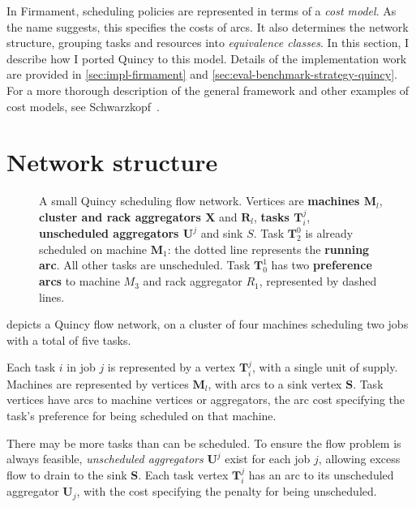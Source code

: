 In Firmament, scheduling policies are represented in terms of a \emph{cost model}. As the name suggests, this specifies the costs of arcs. It also determines the network structure, grouping tasks and resources into \emph{equivalence classes}. In this section, I describe how I ported Quincy to this model. Details of the implementation work are provided in \cref{sec:impl-firmament} and \cref{sec:eval-benchmark-strategy-quincy}. For a more thorough description of the general framework and other examples of cost models, see Schwarzkopf~\cite[ch.~5]{Schwarzkopf:2015}.

\section{Network structure} \label{appendix:flow-scheduling:structure}

\begin{figure}
    \centering
    
    \caption[Quincy scheduling flow network]{A small Quincy scheduling flow network. Vertices are \textbf{\color{blue} machines $\mathbf{M}_l$}, \textbf{\color{brown} cluster and rack aggregators $\mathbf{X}$} and \textbf{\color{brown}$\mathbf{R}_l$}, \textbf{\color{green} tasks $\mathbf{T}_i^j$}, \textbf{\color{red} unscheduled aggregators $\mathbf{U}^j$} and sink $S$. Task $\mathbf{T}_2^0$ is already scheduled on machine $\mathbf{M}_1$: the dotted line represents the \textbf{running arc}. All other tasks are unscheduled. Task $\mathbf{T}_0^1$ has two \textbf{preference arcs} to machine $M_3$ and rack aggregator $R_1$, represented by dashed lines.}
    \label{fig:flow-network-no-costs-appendix}
\end{figure}


 depicts a Quincy flow network, on a cluster of four machines scheduling two jobs with a total of five tasks.

Each task $i$ in job $j$ is represented by a vertex $\mathbf{T}_i^j$, with a single unit of supply. Machines are represented by vertices $\mathbf{M}_l$, with arcs to a sink vertex $\mathbf{S}$. Task vertices have arcs to machine vertices or aggregators, the arc cost specifying the task's preference for being scheduled on that machine.

There may be more tasks than can be scheduled. To ensure the flow problem is always feasible, \emph{unscheduled aggregators} $\mathbf{U}^j$ exist for each job $j$, allowing excess flow to drain to the sink $\mathbf{S}$. Each task vertex $\mathbf{T}_i^j$ has an arc to its unscheduled aggregator $\mathbf{U}_j$, with the cost specifying the penalty for being unscheduled.

